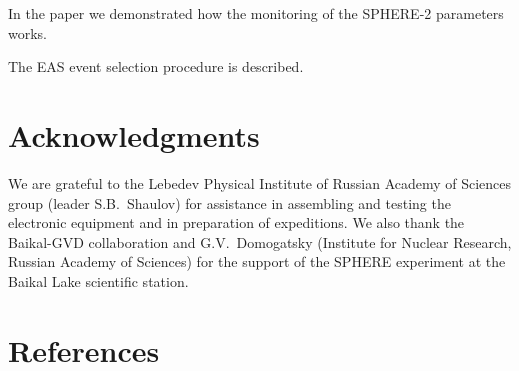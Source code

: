 \documentclass[final,5p,times,twocolumn]{elsarticle}
\begin{document}

In the paper we demonstrated how the monitoring of the SPHERE-2 parameters works. 


The EAS event selection procedure is described.


\section{Acknowledgments}
We are grateful to the Lebedev Physical Institute of Russian Academy of Sciences group (leader S.B.~Shaulov) for assistance in assembling and testing the electronic equipment and in preparation of expeditions. We also thank the Baikal-GVD collaboration and G.V.~Domogatsky (Institute for Nuclear Research, Russian Academy of Sciences) for the support of the SPHERE experiment at the Baikal Lake scientific station.

\section{References}

\end{document}
